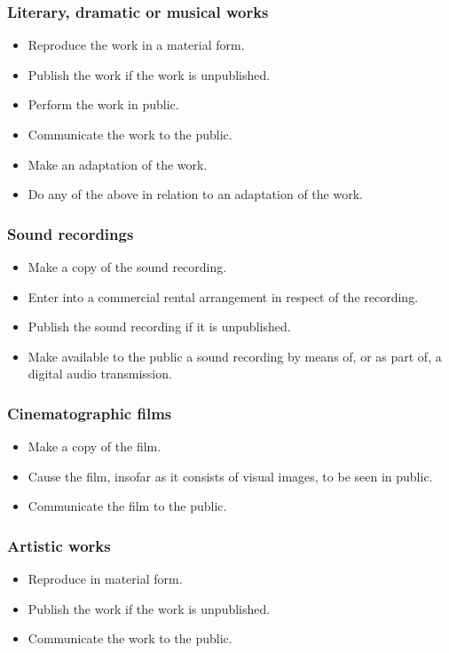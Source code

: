 \documentclass[11pt]{article}
\begin{document}
\subsubsection{Literary, dramatic or musical works}
\label{sec:org38d1c5c}
\begin{itemize}
\item Reproduce the work in a material form.
\item Publish the work if the work is unpublished.
\item Perform the work in public.
\item Communicate the work to the public.
\item Make an adaptation of the work.
\item Do any of the above in relation to an adaptation of the work.
\end{itemize}
\subsubsection{Sound recordings}
\label{sec:org026d050}
\begin{itemize}
\item Make a copy of the sound recording.
\item Enter into a commercial rental arrangement in respect of the recording.
\item Publish the sound recording if it is unpublished.
\item Make available to the public a sound recording by means of, or as part of, a digital audio transmission.
\end{itemize}
\subsubsection{Cinematographic films}
\label{sec:org0c73bbf}
\begin{itemize}
\item Make a copy of the film.
\item Cause the film, insofar as it consists of visual images, to be seen in public.
\item Communicate the film to the public.
\end{itemize}
\subsubsection{Artistic works}
\label{sec:org05b5477}
\begin{itemize}
\item Reproduce in material form.
\item Publish the work if the work is unpublished.
\item Communicate the work to the public.
\end{itemize}
\end{document}
